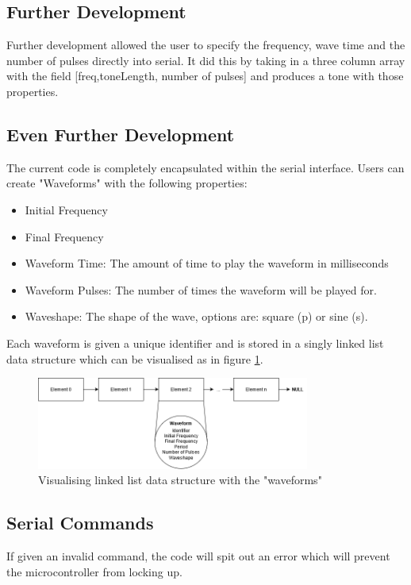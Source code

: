 \documentclass[12pt, a4paper]{article}
\begin{document}
\subsection{Further Development}
Further development allowed the user to specify the frequency, wave time and the number of pulses directly into serial. It did this by taking in a three column array with the field [freq,toneLength, number of pulses] and produces a tone with those properties. 
\subsection{Even Further Development}
The current code is completely encapsulated within the serial interface. Users can create "Waveforms" with the following properties:
\begin{itemize}
	\item Initial Frequency
	\item Final Frequency
	\item Waveform Time: The amount of time to play the waveform in milliseconds
	\item Waveform Pulses: The number of times the waveform will be played for.
	\item Waveshape: The shape of the wave, options are: square (p) or sine (s).
\end{itemize}
Each waveform is given a unique identifier and is stored in a singly linked list data structure which can be visualised as in figure \ref{fig:linkedLists}.
\begin{figure} [!htb]
	\hfill\includegraphics[width=0.8\textwidth]{./Figures/Linked_Lists}\hspace{\fill}
	\caption{Visualising linked list data structure with the "waveforms"}
	\label{fig:linkedLists}
\end{figure} 
\pagebreak

\subsection{Serial Commands}
If given an invalid command, the code will spit out an error which will prevent the microcontroller from locking up.
\end{document}
